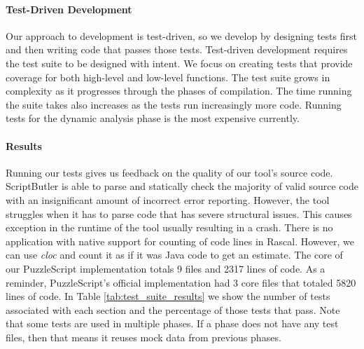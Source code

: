 \paragraph{Test-Driven Development}
Our approach to development is test-driven, so we develop by designing tests first and then writing code that passes those tests. Test-driven development requires the test suite to be designed with intent. We focus on creating tests that provide coverage for both high-level and low-level functions.  The test suite grows in complexity as it progresses through the phases of compilation. The time running the suite takes also increases as the tests run increasingly more code. Running tests for the dynamic analysis phase is the most expensive currently.

\paragraph{Results}
Running our tests gives us feedback on the quality of our tool's source code. ScriptButler is able to parse and statically check the majority of valid source code with an insignificant amount of incorrect error reporting. However, the tool struggles when it has to parse code that has severe structural issues. This causes exception in the runtime of the tool usually resulting in a crash. There is no application with native support for counting of code lines in Rascal. However, we can use \emph{cloc} and count it as if it was Java code to get an estimate. The core of our PuzzleScript implementation totals 9 files and 2317 lines of code. As a reminder, PuzzleScript's official implementation had 3 core files that totaled 5820 lines of code. In Table \ref{tab:test_suite_results} we show the number of tests associated with each section and the percentage of those tests that pass. Note that some tests are used in multiple phases. If a phase does not have any test files, then that means it reuses mock data from previous phases.

